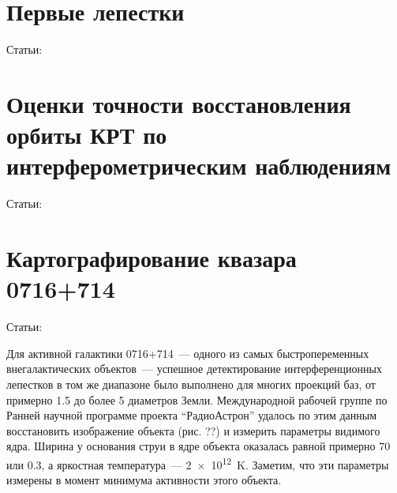 \section{Первые лепестки}

Статьи: \cite{Kardashev_2013_rus}



\section{Оценки точности восстановления орбиты КРТ по интерферометрическим наблюдениям}

Статьи: \cite{Lobanov_2015,Zakhvatkin_2018}


\section{Картографирование квазара 0716+714}

Статьи: \cite{Kardashev_2013_rus}

Для активной галактики 0716+714~--- одного из самых быстропеременных внегалактических объектов~---
успешное детектирование интерференционных лепестков в том же диапазоне было выполнено для многих
проекций баз, от примерно 1.5 до более 5 диаметров Земли. Международной рабочей группе по Ранней
научной программе проекта ``РадиоАстрон'' удалось по этим данным восстановить изображение объекта
(рис. ??) и измерить параметры видимого ядра. Ширина у основания струи в ядре объекта оказалась
равной примерно \SI{70}{\uas} или \SI{0.3}{\parsec}, а яркостная температура~--- \SI{2e12}{\kelvin}.
Заметим, что эти параметры измерены в момент минимума активности этого объекта.
